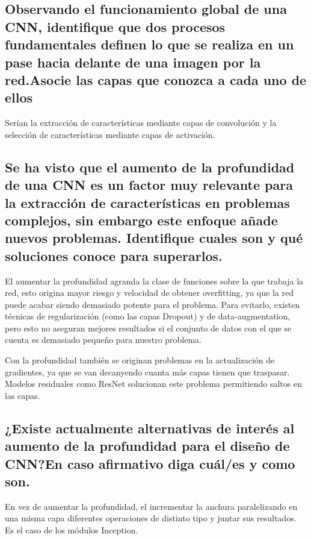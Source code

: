 \documentclass[11pt]{scrartcl} %
\begin{document}
\subsection{Observando el funcionamiento global de una CNN, identifique que
dos procesos fundamentales definen lo que se realiza en un pase hacia
delante de una imagen por la red.\newline Asocie las capas que conozca a cada
uno de ellos}


Serían la extracción de características mediante capas de convolución y la selección de 
características mediante capas de activación.

\subsection{Se ha visto que el aumento de la profundidad de una CNN es un
factor muy relevante para la extracción de características en
problemas complejos, sin embargo este enfoque añade nuevos problemas.\newline
Identifique cuales son y qué soluciones conoce para superarlos.}


El aumentar la profundidad agranda la clase de funciones sobre la que trabaja la red,
esto origina mayor riesgo y velocidad de obtener overfitting, ya que la red
puede acabar siendo demasiado potente para el problema. Para evitarlo,
existen técnicas de regularización (como las capas Dropout) y de 
data-augmentation, pero esto no aseguran mejores resultados si el conjunto de
datos con el que se cuenta es demasiado pequeño para nuestro problema. \newline

Con la profundidad también se originan problemas en la actualización de gradientes,
ya que se van decanyendo cuanta más capas tienen que traspasar. \newline
Modelos residuales como ResNet solucionan este problema permitiendo saltos en
las capas.

\subsection{¿Existe actualmente alternativas de interés al aumento de la
profundidad para el diseño de CNN?\newline En caso afirmativo diga cuál/es y
como son.}


En vez de aumentar la profundidad, el incrementar la anchura paralelizando en 
una misma capa diferentes operaciones de distinto tipo y juntar sus
resultados. Es el caso de los módulos Inception. \newline
\end{document}
